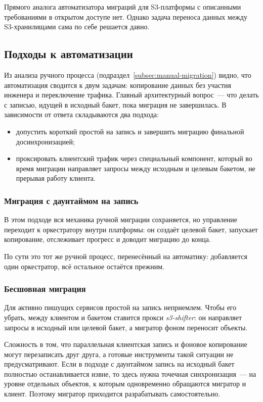 Прямого аналога автоматизатора миграций для S3-платформы с описанными требованиями в открытом доступе нет.
Однако задача переноса данных между S3-хранилищами сама по себе решается давно.

\subsection{Подходы к автоматизации}\label{subsec:approaches}

Из анализа ручного процесса (подраздел~\ref{subsec:manual-migration}) видно, что автоматизация сводится к двум задачам: копирование данных без участия инженера и переключение трафика.
Главный архитектурный вопрос~--- что делать с записью, идущей в исходный бакет, пока миграция не завершилась.
В зависимости от ответа складываются два подхода:
\begin{itemize}
    \item допустить короткий простой на запись и завершить миграцию финальной досинхронизацией;
    \item проксировать клиентский трафик через специальный компонент, который во время миграции направляет запросы между исходным и целевым бакетом, не прерывая работу клиента.
\end{itemize}

\subsubsection{Миграция с даунтаймом на запись}\label{subsubsec:approach-downtime}

В этом подходе вся механика ручной миграции сохраняется, но управление переходит к оркестратору внутри платформы: он создаёт целевой бакет, запускает копирование, отслеживает прогресс и доводит миграцию до конца.

По сути это тот же ручной процесс, перенесённый на автоматику: добавляется один оркестратор, всё остальное остаётся прежним.

\subsubsection{Бесшовная миграция}\label{subsubsec:approach-seamless}

Для активно пишущих сервисов простой на запись неприемлем.
Чтобы его убрать, между клиентом и бакетом ставится прокси \textit{s3-shifter}: он направляет запросы в исходный или целевой бакет, а мигратор фоном переносит объекты.

Сложность в том, что параллельная клиентская запись и фоновое копирование могут перезаписать друг друга, а готовые инструменты такой ситуации не предусматривают.
Если в подходе с даунтаймом запись на исходный бакет полностью останавливается извне, то здесь нужна точечная синхронизация~--- на уровне отдельных объектов, к которым одновременно обращаются мигратор и клиент.
Поэтому мигратор приходится разрабатывать самостоятельно.

